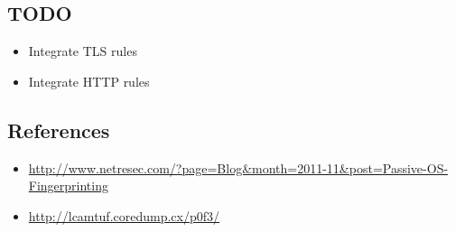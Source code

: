 \documentclass[documentation]{subfiles}
\begin{document}


\subsection{TODO}
\begin{itemize}
    \item Integrate TLS rules
    \item Integrate HTTP rules
\end{itemize}

\subsection{References}
\begin{itemize}
    \item \url{http://www.netresec.com/?page=Blog&month=2011-11&post=Passive-OS-Fingerprinting}
    \item \url{http://lcamtuf.coredump.cx/p0f3/}
\end{itemize}
\end{document}
